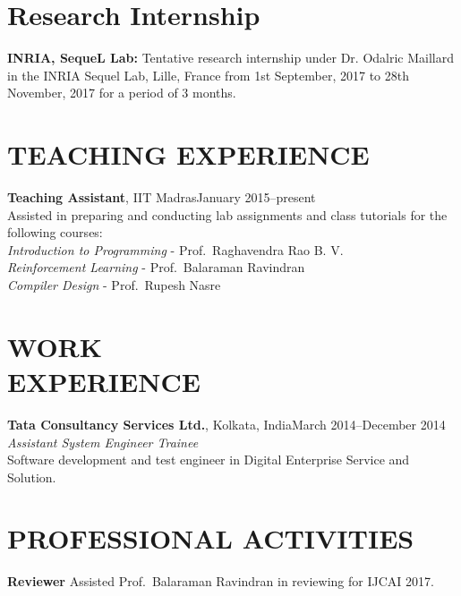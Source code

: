 \documentclass[margin,11pt]{res}
\begin{document}
\begin{resume}
\section{Research Internship}
\textbf{INRIA, SequeL Lab:} Tentative research internship under Dr. Odalric Maillard in the INRIA Sequel Lab, Lille, France from 1st September, 2017 to 28th November, 2017 for a period of $3$ months.

\section{TEACHING EXPERIENCE}
\par
\textbf{Teaching Assistant}, IIT Madras\hfill January 2015--present\\
Assisted in preparing and conducting lab assignments and class tutorials for the following courses:\\
\textit{Introduction to Programming} - Prof.~Raghavendra Rao B. V. \\
\textit{Reinforcement Learning} - Prof.~Balaraman Ravindran\\
\textit{Compiler Design} - Prof.~Rupesh Nasre

\section{WORK\\EXPERIENCE}
\textbf{Tata Consultancy Services Ltd.}, Kolkata, India\hfill March 2014--December 2014\\
\textit{Assistant System Engineer Trainee}\\
Software development and test engineer in Digital Enterprise Service and Solution.


\section{PROFESSIONAL ACTIVITIES}
\textbf{Reviewer} 
Assisted Prof.~Balaraman Ravindran in reviewing for IJCAI 2017.\\



\end{resume}
\end{document}
